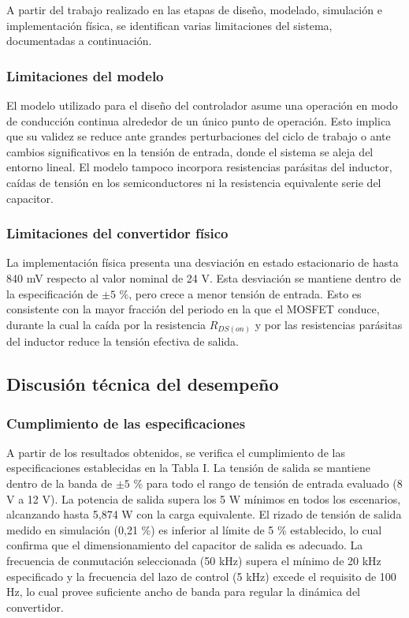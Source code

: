 \documentclass[conference]{IEEEtran}
\begin{document}
A partir del trabajo realizado en las etapas de diseño, modelado, simulación e implementación física, se identifican varias limitaciones del sistema, documentadas a continuación.

\subsubsection{Limitaciones del modelo}

El modelo utilizado para el diseño del controlador asume una operación en modo de conducción continua alrededor de un único punto de operación. Esto implica que su validez se reduce ante grandes perturbaciones del ciclo de trabajo o ante cambios significativos en la tensión de entrada, donde el sistema se aleja del entorno lineal. El modelo tampoco incorpora resistencias parásitas del inductor, caídas de tensión en los semiconductores ni la resistencia equivalente serie del capacitor.

\subsubsection{Limitaciones del convertidor físico}

La implementación física presenta una desviación en estado estacionario de hasta 840 mV respecto al valor nominal de 24 V. Esta desviación se mantiene dentro de la especificación de $\pm 5$ \%, pero crece a menor tensión de entrada. Esto es consistente con la mayor fracción del periodo en la que el MOSFET conduce, durante la cual la caída por la resistencia $R_{DS(on)}$ y por las resistencias parásitas del inductor reduce la tensión efectiva de salida.

\subsection{Discusión técnica del desempeño}

\subsubsection{Cumplimiento de las especificaciones}

A partir de los resultados obtenidos, se verifica el cumplimiento de las especificaciones establecidas en la Tabla I. La tensión de salida se mantiene dentro de la banda de $\pm 5$ \% para todo el rango de tensión de entrada evaluado (8 V a 12 V). La potencia de salida supera los 5 W mínimos en todos los escenarios, alcanzando hasta 5,874 W con la carga equivalente. El rizado de tensión de salida medido en simulación (0,21 \%) es inferior al límite de 5 \% establecido, lo cual confirma que el dimensionamiento del capacitor de salida es adecuado. La frecuencia de conmutación seleccionada (50 kHz) supera el mínimo de 20 kHz especificado y la frecuencia del lazo de control (5 kHz) excede el requisito de 100 Hz, lo cual provee suficiente ancho de banda para regular la dinámica del convertidor.
\end{document}
